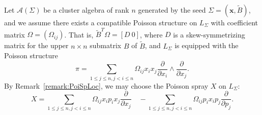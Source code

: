 \documentclass{amsart}
\newcommand{\bfx}{\mathbf{x}}
\newcommand{\cA}{\mathcal{A}}
\begin{document}
Let $\cA(\Sigma)$ be a cluster algebra of rank $n$ generated by the seed $\Sigma=(\bfx,\tilde B)$, and we assume there exists a compatible Poisson structure on $L_\Sigma$ with coefficient matrix $\Omega=(\Omega_{ij})$. That is,  $\tilde B^T\Omega=[D\ 0]$, where $D$ is a skew-symmetrizing matrix for the upper $n\times n$ submatrix $B$ of $\tilde B$, and $L_\Sigma$ is equipped with the Poisson structure
\begin{equation}
	\pi=\sum\limits_{1 \leq j \leq n, j < i \leq n}\Omega_{ij}x_ix_j\frac{\partial}{\partial x_i}\wedge\frac{\partial}{\partial x_j}.
\end{equation}
By Remark~\ref{remark:PoiSpLoc}, we may choose the Poisson spray $X$ on $L_\Sigma$:
\begin{equation}
	X = \sum\limits_{1 \leq j \leq n, j < i \leq n}\Omega_{ij}x_ip_i x_j\frac{\partial}{\partial x_j} \quad - \sum\limits_{1 \leq j \leq n, j < i \leq n}\Omega_{ij}p_ix_i p_j\frac{\partial}{\partial p_j}.
\end{equation}



\end{document}
